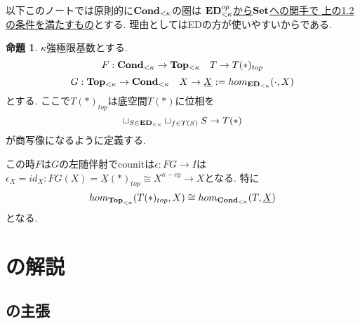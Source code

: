 \documentclass[dvipdfmx,a4paper,11pt]{article}
\theoremstyle{definition}
\newtheorem{prop}[thm]{命題}
\begin{document}
以下このノートでは原則的に${ \bf Cond}_{<\kappa}$の圏は
\underline{${\bf ED}_{< \kappa}^{op}$から${\bf Set}$への関手で 
上の1.2の条件を満たすもの}とする. 理由としてはEDの方が使いやすいからである.


\begin{tcolorbox}
 [colback = white, colframe = green!35!black, fonttitle = \bfseries,breakable = true]
\begin{prop}\cite[proposition 1.7]{Sch19}
$\kappa$強極限基数とする. 
$$
F : {\bf Cond}_{< \kappa} \to {\bf Top_{<\kappa}} \quad T \to T(\ast)_{top}
$$
$$
G :  {\bf Top_{<\kappa}} \to {\bf Cond}_{< \kappa} \quad X \to \underline{X}:=hom_{{\bf ED}_{<\kappa}}(\cdot, X)
$$
とする. 
ここで$T(\ast)_{top}$は底空間$T(\ast)$に位相を
$$
\sqcup_{S \in {\bf ED}_{<\kappa}}  \sqcup_{f \in T(S) }  S \to T(\ast)
$$
が商写像になるように定義する.

この時$F$は$G$の左随伴射でcounitは$\epsilon : FG \to I$は$\epsilon_{X}=id_{X}: FG(X)=\underline{X}(\ast)_{top}\cong X^{\kappa-cg} \to X$となる. 
特に
$$
hom_{{\bf Top}_{<\kappa}}(T(\ast)_{top}, X) \cong hom_{{\bf Cond}_{<\kappa}}(T, \underline{X})
$$
となる. 
 \end{prop}
 \end{tcolorbox}



\section{\cite[Proposition 2.9]{Sch19}の解説}



\subsection{\cite[Proposition 2.9]{Sch19}の主張}
\end{document}
